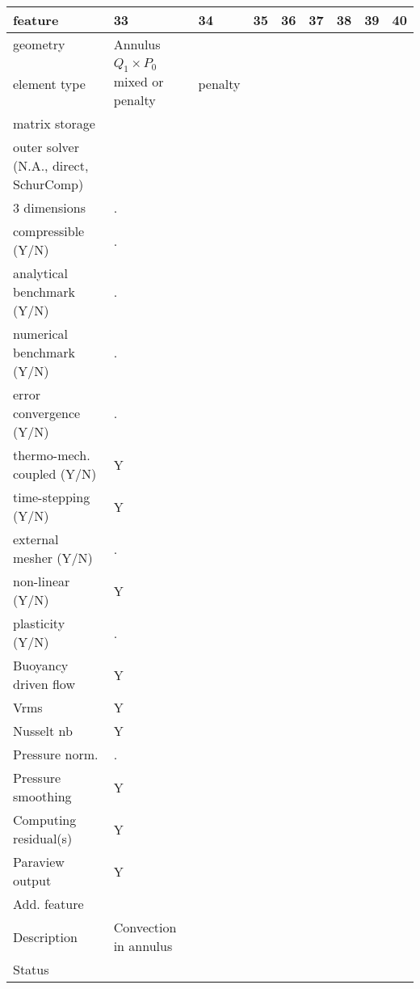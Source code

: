 \begin{landscape}
\vspace{.5cm}

\noindent
{\tiny
\begin{tabular}{|l|p{2cm}|p{2cm}|p{2cm}|p{2cm}|p{2cm}|p{2cm}|p{2cm}|p{2cm}|} 
\hline
feature & 33 & 34 & 35 & 36 & 37 & 38 & 39 & 40 \\ 
\hline
geometry & Annulus & & \\ 
element type & $Q_1\times P_0$ 
mixed or penalty  & penalty &  \\ 
matrix storage &  &  \\ 
outer solver (N.A., direct, SchurComp) &  & \\ 
\hline
3 dimensions 			& . &  \\ 
compressible (Y/N)  		& . &  \\ 
analytical benchmark (Y/N) 	& . &  \\ 
numerical benchmark (Y/N) 	& . &  \\ 
error convergence (Y/N) 	& . &  \\ 
thermo-mech. coupled (Y/N) 	& Y &  \\ 
time-stepping (Y/N) 		& Y &  \\ 
external mesher (Y/N) 		& . &  \\ 
non-linear (Y/N) 		& Y &  \\ 
plasticity (Y/N) 		& . &  \\ 
Buoyancy driven flow 		& Y &  \\ 
Vrms  				& Y &  \\ 
Nusselt nb  			& Y &  \\ 
Pressure norm. 			& . &  \\ 
Pressure smoothing 		& Y &  \\ 
Computing residual(s) 		& Y &  \\ 
Paraview output 		& Y &  \\ 
\hline
Add. feature & & & & &\\
\hline
Description & Convection  in annulus & \\ 
\hline
Status &  &   \\
\hline
\end{tabular}
}



\end{landscape}
